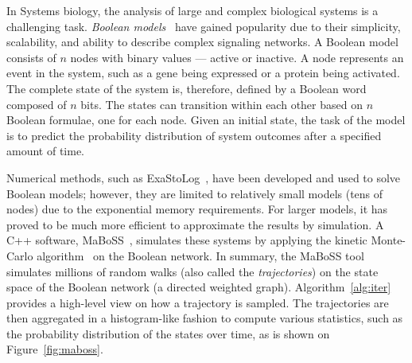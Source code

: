 



In Systems biology, the analysis of large and complex biological systems is a challenging task. \emph{Boolean models}~\cite{wang2012boolean} have gained popularity due to their simplicity, scalability, and ability to describe complex signaling networks. A Boolean model consists of $n$ nodes with binary values --- active or inactive. A node represents an event in the system, such as a gene being expressed or a protein being activated. The complete state of the system is, therefore, defined by a Boolean word composed of $n$ bits. The states can transition within each other based on $n$ Boolean formulae, one for each node. Given an initial state, the task of the model is to predict the probability distribution of system outcomes after a specified amount of time.

Numerical methods, such as ExaStoLog~\cite{koltai2020exact}, have been developed and used to solve Boolean models; however, they are limited to relatively small models (tens of nodes) due to the exponential memory requirements. For larger models, it has proved to be much more efficient to approximate the results by simulation. A C++ software, MaBoSS~\cite{stoll2017maboss}, simulates these systems by applying the kinetic Monte-Carlo algorithm~\cite{stoll2012continuous} on the Boolean network. In summary, the MaBoSS tool simulates millions of random walks (also called the \emph{trajectories}) on the state space of the Boolean network (a directed weighted graph). Algorithm~\ref{alg:iter} provides a high-level view on how a trajectory is sampled. The trajectories are then aggregated in a histogram-like fashion to compute various statistics, such as the probability distribution of the states over time, as is shown on Figure~\ref{fig:maboss}.


